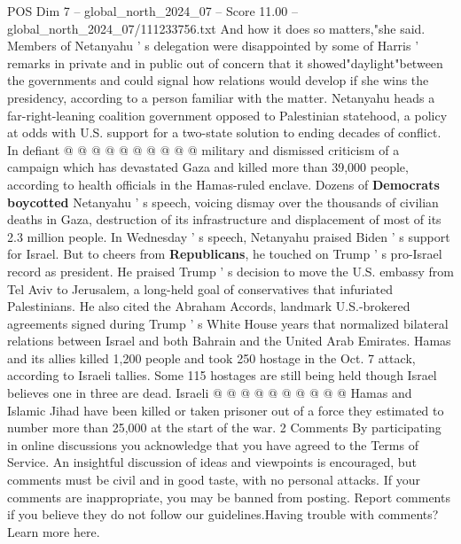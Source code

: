 \begin{textsample}{POS Dim 7 – global\_north\_2024\_07 – Score 11.00 – global\_north\_2024\_07/111233756.txt}
And how it does so matters,"she said.
Members of Netanyahu ' s delegation were disappointed by some of Harris ' remarks in private and in public out of concern that it showed"daylight"between the governments and could signal how relations would develop if she wins the presidency, according to a person familiar with the matter.
Netanyahu heads a far-right-leaning coalition government opposed to Palestinian statehood, a policy at odds with U.S. support for a two-state solution to ending decades of conflict.
In defiant @ @ @ @ @ @ @ @ @ @ military and dismissed criticism of a campaign which has devastated Gaza and killed more than 39,000 people, according to health officials in the Hamas-ruled enclave.
Dozens of \textbf{Democrats} \textbf{boycotted} Netanyahu ' s speech, voicing dismay over the thousands of civilian deaths in Gaza, destruction of its infrastructure and displacement of most of its 2.3 million people.
In Wednesday ' s speech, Netanyahu praised Biden ' s support for Israel.
But to cheers from \textbf{Republicans}, he touched on Trump ' s pro-Israel record as president.
He praised Trump ' s decision to move the U.S. embassy from Tel Aviv to Jerusalem, a long-held goal of conservatives that infuriated Palestinians.
He also cited the Abraham Accords, landmark U.S.-brokered agreements signed during Trump ' s White House years that normalized bilateral relations between Israel and both Bahrain and the United Arab Emirates.
Hamas and its allies killed 1,200 people and took 250 hostage in the Oct. 7 attack, according to Israeli tallies.
Some 115 hostages are still being held though Israel believes one in three are dead.
Israeli @ @ @ @ @ @ @ @ @ @ Hamas and Islamic Jihad have been killed or taken prisoner out of a force they estimated to number more than 25,000 at the start of the war. 2 Comments By participating in online discussions you acknowledge that you have agreed to the Terms of Service.
An insightful discussion of ideas and viewpoints is encouraged, but comments must be civil and in good taste, with no personal attacks.
If your comments are inappropriate, you may be banned from posting.
Report comments if you believe they do not follow our guidelines.Having trouble with comments?
Learn more here.

\end{textsample}
